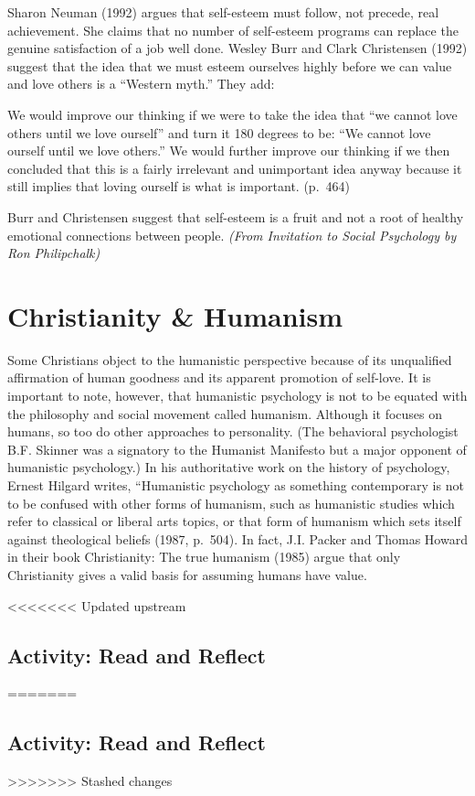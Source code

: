 \documentclass[
]{book}
\begin{document}
Sharon Neuman (1992) argues that self-esteem must follow, not precede, real achievement. She claims that no number of self-esteem programs can replace the genuine satisfaction of a job well done. Wesley Burr and Clark Christensen (1992) suggest that the idea that we must esteem ourselves highly before we can value and love others is a ``Western myth.'' They add:

We would improve our thinking if we were to take the idea that ``we cannot love others until we love ourself'' and turn it 180 degrees to be: ``We cannot love ourself until we love others.'' We would further improve our thinking if we then concluded that this is a fairly irrelevant and unimportant idea anyway because it still implies that loving ourself is what is important. (p.~464)

Burr and Christensen suggest that self-esteem is a fruit and not a root of healthy emotional connections between people. \emph{(From Invitation to Social Psychology by Ron Philipchalk)}

\hypertarget{christianity-humanism}{%
\section{Christianity \& Humanism}\label{christianity-humanism}}

Some Christians object to the humanistic perspective because of its unqualified affirmation of human goodness and its apparent promotion of self-love. It is important to note, however, that humanistic psychology is not to be equated with the philosophy and social movement called humanism. Although it focuses on humans, so too do other approaches to personality. (The behavioral psychologist B.F. Skinner was a signatory to the Humanist Manifesto but a major opponent of humanistic psychology.) In his authoritative work on the history of psychology, Ernest Hilgard writes, ``Humanistic psychology as something contemporary is not to be confused with other forms of humanism, such as humanistic studies which refer to classical or liberal arts topics, or that form of humanism which sets itself against theological beliefs (1987, p.~504). In fact, J.I. Packer and Thomas Howard in their book Christianity: The true humanism (1985) argue that only Christianity gives a valid basis for assuming humans have value.

<<<<<<< Updated upstream
\hypertarget{activity-read-and-reflect-3}{%
\subsection*{Activity: Read and Reflect}\label{activity-read-and-reflect-3}}
=======
\hypertarget{activity-read-and-reflect-2}{%
\subsection*{Activity: Read and Reflect}\label{activity-read-and-reflect-2}}
>>>>>>> Stashed changes
\end{document}
